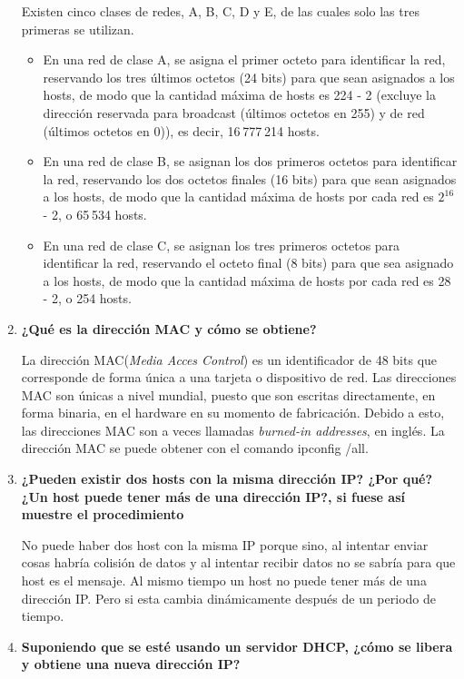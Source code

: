 \documentclass[a4paper,12pt]{article}
\begin{document}
\begin{enumerate}
 Existen cinco clases de redes, A, B, C, D y E, de las cuales solo las tres primeras se utilizan.
 \begin{itemize}
  \item En una red de clase A, se asigna el primer octeto para identificar la red, reservando los tres últimos octetos (24 bits) para que sean asignados a los hosts, de modo que la cantidad máxima de hosts es 224 - 2 (excluye la dirección reservada para broadcast (últimos octetos en 255) y de red (últimos octetos en 0)), es decir, 16 777 214 hosts.
  \item En una red de clase B, se asignan los dos primeros octetos para identificar la red, reservando los dos octetos finales (16 bits) para que sean asignados a los hosts, de modo que la cantidad máxima de hosts por cada red es $2^{16}$ - 2, o 65 534 hosts.
  \item En una red de clase C, se asignan los tres primeros octetos para identificar la red, reservando el octeto final (8 bits) para que sea asignado a los hosts, de modo que la cantidad máxima de hosts por cada red es 28 - 2, o 254 hosts.
 \end{itemize}

 \item \textbf{¿Qué es la dirección MAC y cómo se obtiene?}
 
 La dirección MAC(\textit{Media Acces Control}) es un identificador de 48 bits que corresponde de forma única a una tarjeta o 
 dispositivo de red. Las direcciones MAC son únicas a nivel mundial, puesto que son escritas directamente, en forma binaria,
 en el hardware en su momento de fabricación. Debido a esto, las direcciones MAC son a veces llamadas \textit{burned-in addresses}, en inglés.
 La dirección MAC se puede obtener con el comando ipconfig /all.
 
 \item \textbf{¿Pueden existir dos hosts con la misma dirección IP? ¿Por qué?
 ¿Un host puede tener más de una dirección IP?, si fuese así muestre el procedimiento}
 
 No puede haber dos host con la misma IP porque sino, al intentar enviar cosas habría colisión de datos y al intentar recibir datos
 no se sabría para que host es el mensaje. Al mismo tiempo un host no puede tener más de una dirección IP. Pero si esta cambia dinámicamente
 después de un periodo de tiempo.
 
 \item \textbf{Suponiendo que se esté usando un servidor DHCP, ¿cómo se libera y obtiene una nueva dirección IP?}
 

\end{enumerate}
\end{document}
